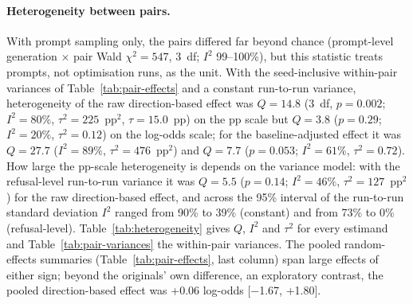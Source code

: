 \paragraph{Heterogeneity between pairs.} With prompt sampling only, the
pairs differed far beyond chance (prompt-level generation $\times$ pair Wald
$\chi^2=547$, 3~df; $I^2$ 99--100\%), but this statistic treats prompts, not
optimisation runs, as the unit. With the seed-inclusive within-pair variances
of Table~\ref{tab:pair-effects} and a constant run-to-run variance,
heterogeneity of the raw direction-based effect was $Q=14.8$ (3~df, $p=0.002$;
$I^2=80\%$, $\tau^2=225$~pp$^2$, $\tau=15.0$~pp) on the pp scale but $Q=3.8$
($p=0.29$; $I^2=20\%$, $\tau^2=0.12$) on the log-odds scale; for the
baseline-adjusted effect it was $Q=27.7$ ($I^2=89\%$, $\tau^2=476$~pp$^2$) and
$Q=7.7$ ($p=0.053$; $I^2=61\%$, $\tau^2=0.72$). How large the pp-scale
heterogeneity is depends on the variance model: with the refusal-level
run-to-run variance it was $Q=5.5$ ($p=0.14$; $I^2=46\%$, $\tau^2=127$~pp$^2$)
for the raw direction-based effect, and across the 95\% interval of the
run-to-run standard deviation $I^2$ ranged from 90\% to 39\% (constant) and
from 73\% to 0\% (refusal-level). Table~\ref{tab:heterogeneity} gives $Q$,
$I^2$ and $\tau^2$ for every estimand and Table~\ref{tab:pair-variances} the
within-pair variances. The pooled random-effects summaries
(Table~\ref{tab:pair-effects}, last column) span large effects of either sign;
beyond the originals' own difference, an exploratory contrast, the pooled
direction-based effect was +0.06 log-odds [$-$1.67, +1.80].

